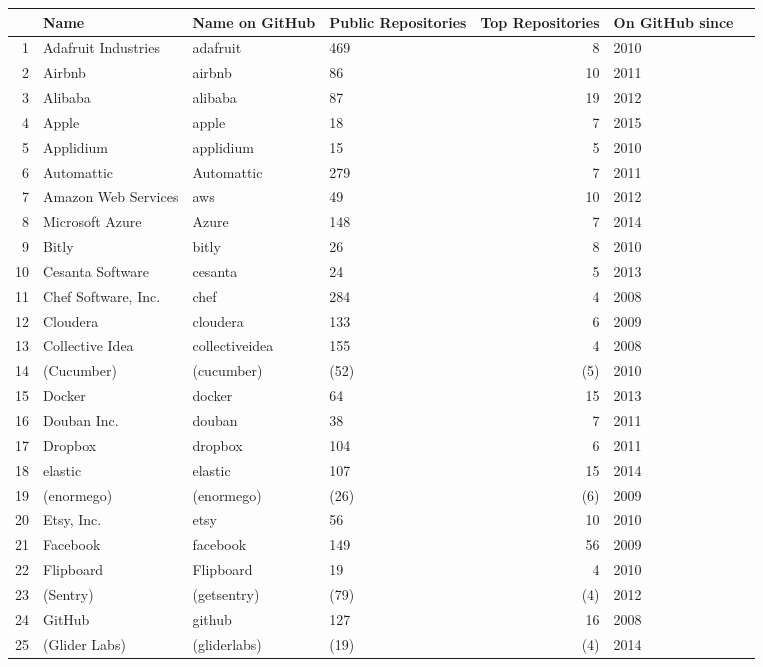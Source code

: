 
\begin{longtable}{rlllrlr}


  \hline
 & Name & Name on GitHub & Public Repositories & Top Repositories & On GitHub since \\
  \hline
  \endhead
1 & Adafruit Industries & adafruit & 469 &   8 & 2010 \\
  2 & Airbnb & airbnb &  86 &  10 & 2011 \\
  3 & Alibaba & alibaba &  87 &  19 & 2012 \\
  4 & Apple & apple &  18 &   7 & 2015 \\
  5 & Applidium & applidium &  15 &   5 & 2010 \\
  6 & Automattic & Automattic & 279 &   7 & 2011 \\
  7 & Amazon Web Services & aws &  49 &  10 & 2012 \\
  8 & Microsoft Azure & Azure & 148 &   7 & 2014 \\
  9 & Bitly & bitly &  26 &   8 & 2010 \\
  10 & Cesanta Software & cesanta &  24 &   5 & 2013 \\
  11 & Chef Software, Inc. & chef & 284 &   4 & 2008 \\
  12 & Cloudera & cloudera & 133 &   6 & 2009 \\
  13 & Collective Idea & collectiveidea & 155 &   4 & 2008 \\
  14 & (Cucumber) & (cucumber) &  (52) &   (5) & 2010 \\
  15 & Docker & docker &  64 &  15 & 2013 \\
  16 & Douban Inc. & douban &  38 &   7 & 2011 \\
  17 & Dropbox & dropbox & 104 &   6 & 2011 \\
  18 & elastic & elastic & 107 &  15 & 2014 \\
  19 & (enormego) & (enormego) &  (26) &   (6) & 2009 \\
  20 & Etsy, Inc. & etsy &  56 &  10 & 2010 \\
  21 & Facebook & facebook & 149 &  56 & 2009 \\
  22 & Flipboard & Flipboard &  19 &   4 & 2010 \\
  23 & (Sentry) & (getsentry) &  (79) &   (4) & 2012 \\
  24 & GitHub & github & 127 &  16 & 2008 \\
  25 & (Glider Labs) & (gliderlabs) &  (19) &   (4) & 2014 \\

\end{longtable}
